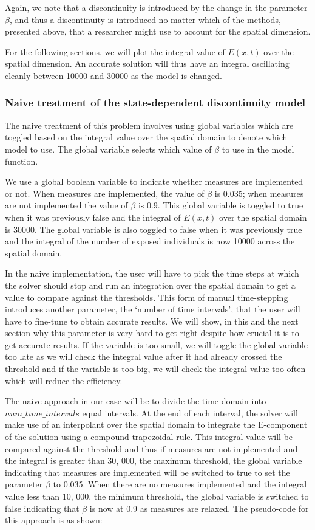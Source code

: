 \documentclass{article}
\begin{document}
Again, we note that a discontinuity is introduced by the change in the parameter $\beta$, and thus a discontinuity is introduced no matter which of the methods, presented above, that a researcher might use to account for the spatial dimension.

For the following sections, we will plot the integral value of $E(x, t)$ over the spatial dimension. An accurate solution will thus have an integral oscillating cleanly between 10000 and 30000 as the model is changed.

\subsubsection{Naive treatment of the state-dependent discontinuity model}
\label{subsubsection:pde_state_naive}
The naive treatment of this problem involves using global variables which are toggled based on the integral value over the spatial domain to denote which model to use. The global variable selects which value of $\beta$ to use in the model function.

We use a global boolean variable to indicate whether measures are implemented or not. When measures are implemented, the value of $\beta$ is 0.035; when measures are not implemented the value of $\beta$ is 0.9. This global variable is toggled to true when it was previously false and the integral of $E(x, t)$ over the spatial domain is 30000. The global variable is also toggled to false when it was previously true and the integral of the number of exposed individuals is now 10000 across the spatial domain. 

In the naive implementation, the user will have to pick the time steps at which the solver should stop and run an integration over the spatial domain to get a value to compare against the thresholds. This form of manual time-stepping introduces another parameter, the `number of time intervals', that the user will have to fine-tune to obtain accurate results. We will show, in this and the next section why this parameter is very hard to get right despite how crucial it is to get accurate results. If the variable is too small, we will toggle the global variable too late as we will check the integral value after it had already crossed the threshold and if the variable is too big, we will check the integral value too often which will reduce the efficiency. 

The naive approach in our case will be to divide the time domain into $num\_time\_intervals$ equal intervals. At the end of each interval, the solver will make use of an interpolant over the spatial domain to integrate the E-component of the solution using a compound trapezoidal rule. This integral value will be compared against the threshold and thus if measures are not implemented and the integral is greater than 30, 000, the maximum threshold, the global variable indicating that measures are implemented will be switched to true to set the parameter $\beta$ to 0.035. When there are no measures implemented and the integral value less than 10, 000, the minimum threshold, the global variable is switched to false indicating that $\beta$ is now at 0.9 as measures are relaxed. The pseudo-code for this approach is as shown:
\end{document}
